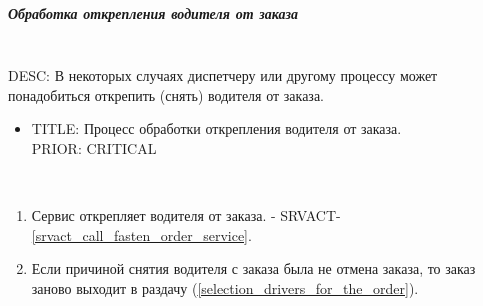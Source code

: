 \subparagraph{Обработка открепления водителя от заказа} \label{remove_driver_from_order} \mbox{}\\

  DESC: В некоторых случаях диспетчеру или другому процессу может понадобиться открепить (снять) водителя от заказа. 

  \begin{itemize}

   \item {
      TITLE: Процесс обработки открепления водителя от заказа.
      \\
      PRIOR: CRITICAL\\
   }

   \end{itemize}


    	\begin{alg}  \label{remove_driver_from_order_alg} \mbox{}\\

        \begin{enumerate}

          \item Сервис открепляет водителя от заказа. - SRVACT-\ref{srvact_call_fasten_order_service}.
          
          \item Если причиной снятия водителя с заказа была не отмена заказа, то заказ заново выходит в раздачу (\ref{selection_drivers_for_the_order}).

        \end{enumerate}
      \end{alg}